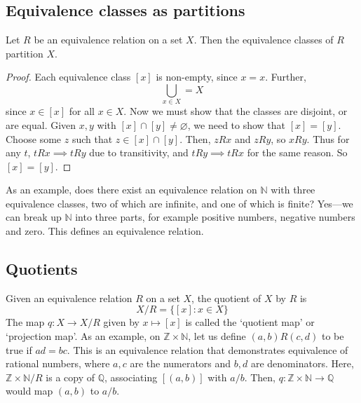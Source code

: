 \subsection{Equivalence classes as partitions}
\begin{proposition}
	Let \(R\) be an equivalence relation on a set \(X\).
	Then the equivalence classes of \(R\) partition \(X\).
\end{proposition}
\begin{proof}
	Each equivalence class \([x]\) is non-empty, since \(x = x\).
	Further,
	\[
		\bigcup_{x \in X} = X
	\]
	since \(x \in [x]\) for all \(x \in X\).
	Now we must show that the classes are disjoint, or are equal.
	Given \(x, y\) with \([x] \cap [y] \neq \varnothing\), we need to show that \([x] = [y]\).
	Choose some \(z\) such that \(z \in [x] \cap [y]\).
	Then, \(zRx\) and \(zRy\), so \(xRy\).
	Thus for any \(t\), \(tRx \implies tRy\) due to transitivity, and \(tRy \implies tRx\) for the same reason.
	So \([x] = [y]\).
\end{proof}
As an example, does there exist an equivalence relation on \(\mathbb N\) with three equivalence classes, two of which are infinite, and one of which is finite?
Yes---we can break up \(\mathbb N\) into three parts, for example positive numbers, negative numbers and zero.
This defines an equivalence relation.

\subsection{Quotients}
Given an equivalence relation \(R\) on a set \(X\), the quotient of \(X\) by \(R\) is
\[
	X/R = \{ [x]: x \in X \}
\]
The map \(q\colon X\to X/R\) given by \(x \mapsto [x]\) is called the `quotient map' or `projection map'.
As an example, on \(\mathbb Z \times \mathbb N\), let us define \((a, b)R(c, d)\) to be true if \(ad=bc\).
This is an equivalence relation that demonstrates equivalence of rational numbers, where \(a, c\) are the numerators and \(b, d\) are denominators.
Here, \(\mathbb Z \times \mathbb N / R\) is a copy of \(\mathbb Q\), associating \([(a, b)]\) with \(a/b\).
Then, \(q\colon \mathbb Z \times \mathbb N \to \mathbb Q\) would map \((a, b)\) to \(a/b\).
